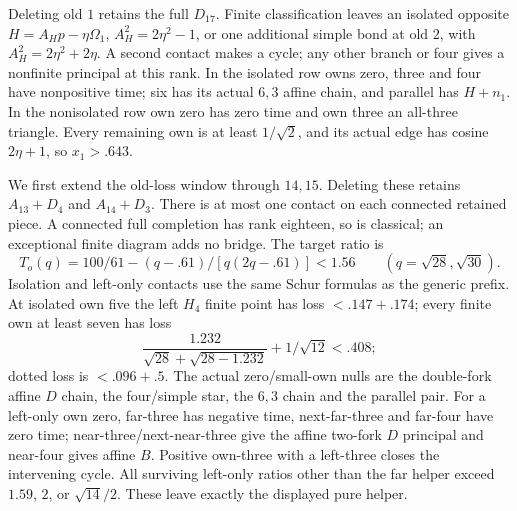 Deleting old \(1\) retains the full \(D_{17}\).
Finite classification leaves an isolated opposite
\(H=A_Hp-\eta\Omega_1\), \(A_H^2=2\eta^2-1\),
or one additional simple bond at old \(2\),
with \(A_H^2=2\eta^2+2\eta\).
A second contact makes a cycle; any other branch or four gives a
nonfinite principal at this rank.
In the isolated row owns zero, three and four have nonpositive time;
six has its actual \(6,3\) affine chain, and parallel has \(H+n_1\).
In the nonisolated row own zero has zero time and own three an
all-three triangle. Every remaining own is at least \(1/\sqrt2\),
and its actual edge has cosine \(2\eta+1\), so \(x_1>.643\).

We first extend the old-loss window through \(14,15\).
Deleting these retains \(A_{13}+D_4\) and \(A_{14}+D_3\).
There is at most one contact on each connected retained piece.
A connected full completion has rank eighteen, so is classical;
an exceptional finite diagram adds no bridge.
The target ratio is
\[
 T_o(q)=100/61-(q-.61)/[q(2q-.61)]<1.56
 \qquad(q=\sqrt{28},\sqrt{30}).
\]
Isolation and left-only contacts use the same Schur formulas as the
generic prefix. At isolated own five the left \(H_4\) finite point
has loss \(<.147+.174\); every finite own at least seven has loss
\[
 \frac{1.232}{\sqrt{28}+\sqrt{28-1.232}}+1/\sqrt{12}<.408;
\]
dotted loss is \(<.096+.5\).
The actual zero/small-own nulls are the double-fork affine \(D\)
chain, the four/simple star, the \(6,3\) chain and the parallel pair.
For a left-only own zero, far-three has negative time, next-far-three
and far-four have zero time; near-three/next-near-three give the
affine two-fork \(D\) principal and near-four gives affine \(B\).
Positive own-three with a left-three closes the intervening cycle.
All surviving left-only ratios other than the far helper exceed
\(1.59\), \(2\), or \(\sqrt{14}/2\).
These leave exactly the displayed pure helper.

